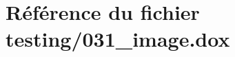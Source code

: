 \hypertarget{031__image_8dox}{}\section{Référence du fichier testing/031\+\_\+image.dox}
\label{031__image_8dox}
